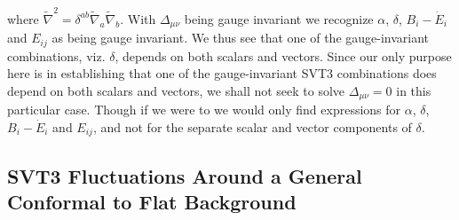 %
where $\tilde\nabla^{2} = \delta^{ab} \tilde\nabla_a\tilde\nabla_b$. With $\Delta_{\mu\nu}$ being gauge invariant we recognize $\alpha$, $\delta$, $B_i-\dot{E}_i$ and $E_{ij}$ as being gauge invariant. We thus see that one of the gauge-invariant combinations, viz. $\delta$, depends on both scalars and vectors. Since our only purpose here is in establishing that one of the gauge-invariant SVT3 combinations does depend on both scalars and vectors, we shall not seek to solve $\Delta_{\mu\nu}=0$ in this particular case. Though if we were to we would only find expressions for $\alpha$, $\delta$, $B_i-\dot{E}_i$ and $E_{ij}$, and not for the separate scalar and vector components of $\delta$.

\subsection{SVT3 Fluctuations Around a General Conformal to Flat Background}
\label{ss:fluctuations_around_general_conformal_flat}

